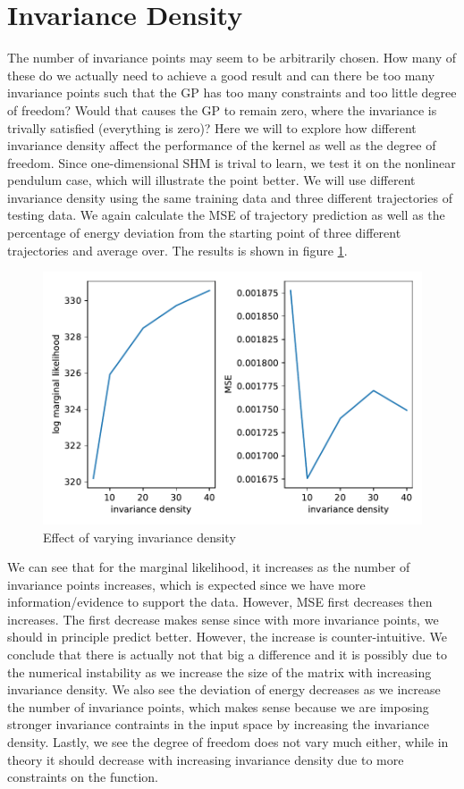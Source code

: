 \documentclass{statsmsc}
\begin{document}
\section{Invariance Density}
The number of invariance points may seem to be arbitrarily chosen. 
How many of these do we actually need to achieve a good result and can there be too many invariance points such that the GP has too many constraints and too little degree of freedom?
Would that causes the GP to remain zero, where the invariance is trivally satisfied (everything is zero)?
Here we will to explore how different invariance density affect the performance of the kernel as well as the degree of freedom.
Since one-dimensional SHM is trival to learn, we test it on the nonlinear pendulum case, which will illustrate the point better. 
We will use different invariance density using the same training data and three different trajectories of testing data.
We again calculate the MSE of trajectory prediction as well as the percentage of energy deviation from the starting point of three different trajectories and average over.
The results is shown in figure \ref{fig:vary_invariance_density}.

\begin{figure}[H] 
  \includegraphics[width=0.8\linewidth]{../codes/figures/vary_invariance.pdf}
  \centering
  \caption{Effect of varying invariance density}
  \label{fig:vary_invariance_density}
\end{figure}

We can see that for the marginal likelihood, it increases as the number of invariance points increases, which is expected since we have more information/evidence to support the data.
However, MSE first decreases then increases.
The first decrease makes sense since with more invariance points, we should in principle predict better.
However, the increase is counter-intuitive.
We conclude that there is actually not that big a difference and it is possibly due to the numerical instability as we increase the size of the matrix with increasing invariance density.  
We also see the deviation of energy decreases as we increase the number of invariance points, which makes sense because we are imposing stronger invariance contraints in the input space by increasing the invariance density.
Lastly, we see the degree of freedom does not vary much either, while in theory it should decrease with increasing invariance density due to more constraints on the function.
\end{document}
